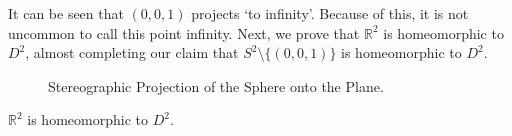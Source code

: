             It can be seen that $(0,0,1)$ projects `to infinity'. Because of
            this, it is not uncommon to call this point infinity. Next, we
            prove that $\mathbb{R}^{2}$ is homeomorphic to $D^{2}$, almost
            completing our claim that $S^{2}\setminus\{(0,0,1)\}$
            is homeomorphic to $D^{2}$.
            \begin{figure}[H]
                \captionsetup{type=figure}
                \centering
                
                \caption{Stereographic Projection of the Sphere onto the Plane.}
                \label{fig:stereographic_projection}
            \end{figure}
            \begin{theorem}
                $\mathbb{R}^{2}$ is homeomorphic to $D^{2}$.
            \end{theorem}
